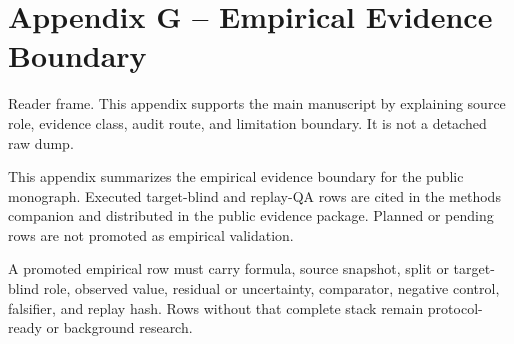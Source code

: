 \section{Appendix G -- Empirical Evidence Boundary}
Reader frame. This appendix supports the main manuscript by explaining source role, evidence class, audit route, and limitation boundary. It is not a detached raw dump.


\label{sec:oc-core-1-3-empirical-evidence-boundary-appendix}

This appendix summarizes the empirical evidence boundary for the public monograph. Executed target-blind and replay-QA rows are cited in the methods companion and distributed in the public evidence package. Planned or pending rows are not promoted as empirical validation.


A promoted empirical row must carry formula, source snapshot, split or target-blind role, observed value, residual or uncertainty, comparator, negative control, falsifier, and replay hash. Rows without that complete stack remain protocol-ready or background research.
